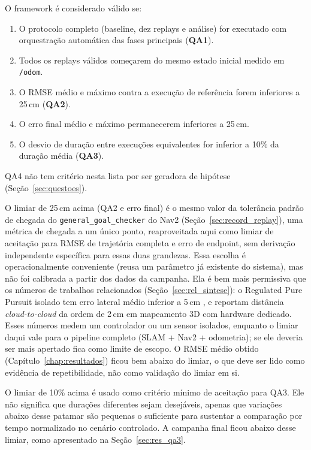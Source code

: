 O framework é considerado válido se:

\begin{enumerate}
    \item O protocolo completo (baseline, dez replays e análise) for executado
    com orquestração automática das fases principais (\textbf{QA1}).

    \item Todos os replays válidos começarem do mesmo estado inicial medido em
    \texttt{/\allowbreak odom}.

    \item O RMSE médio e máximo contra a execução de referência forem inferiores
    a 25\,cm (\textbf{QA2}).

    \item O erro final médio e máximo permanecerem inferiores a 25\,cm.

    \item O desvio de duração entre execuções equivalentes for inferior a 10\%
    da duração média (\textbf{QA3}).
\end{enumerate}

\noindent QA4 não tem critério nesta lista por ser geradora de hipótese
(Seção~\ref{sec:questoes}).

O limiar de 25\,cm acima (QA2 e erro final) é o mesmo valor da tolerância
padrão de chegada do \texttt{general\_\allowbreak goal\_\allowbreak checker} do
Nav2 (Seção~\ref{sec:record_replay}), uma métrica de chegada a um
único ponto, reaproveitada aqui como limiar de aceitação para RMSE de
trajetória completa e erro de endpoint, sem derivação independente
específica para essas duas grandezas. Essa escolha é operacionalmente
conveniente (reusa um parâmetro já existente do sistema), mas não foi
calibrada a partir dos dados da campanha. Ela é bem mais permissiva que os
números de trabalhos relacionados (Seção~\ref{sec:rel_sintese}): o Regulated
Pure Pursuit isolado tem erro lateral médio inferior a 5\,cm
\cite{macenski2023survey}, e  reportam distância
\textit{cloud-to-cloud} da ordem de 2\,cm em mapeamento 3D com hardware
dedicado. Esses números medem um controlador ou um sensor isolados, enquanto o
limiar daqui vale para o pipeline completo (SLAM + Nav2 + odometria); se ele
deveria ser mais apertado fica como limite de escopo. O RMSE médio obtido
(Capítulo~\ref{chap:resultados}) ficou bem abaixo do limiar, o que deve ser lido
como evidência de repetibilidade, não como validação do limiar em si.

O limiar de 10\% acima é usado como critério mínimo de aceitação para QA3. Ele
não significa que durações diferentes sejam desejáveis, apenas que variações
abaixo desse patamar são pequenas o suficiente para sustentar a comparação por
tempo normalizado no cenário controlado. A campanha final ficou abaixo desse
limiar, como apresentado na Seção~\ref{sec:res_qa3}.

